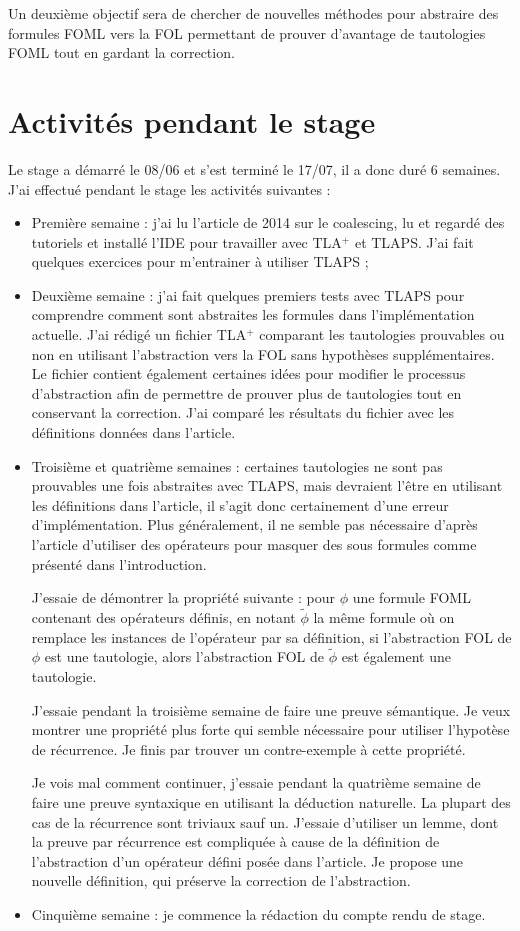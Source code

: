 \documentclass[12pt]{article}
\begin{document}
Un deuxième objectif sera de chercher de nouvelles méthodes pour abstraire des formules FOML vers la FOL permettant de prouver d'avantage de tautologies FOML tout en gardant la correction.

\section{Activités pendant le stage}

Le stage a démarré le 08/06 et s'est terminé le 17/\textcolor{myblue}{07}, il a donc duré 6 semaines.
J'ai effectué pendant le stage les activités suivantes :
\begin{itemize}
\item
  Première semaine :
  j'ai lu l'article de 2014 sur le coalescing, lu et regardé des tutoriels et installé l'IDE pour travailler avec TLA$^+$ et TLAPS. J'ai fait quelques exercices pour m'entrainer à utiliser TLAPS ;
\item
  Deuxième semaine :
  j'ai fait quelques premiers tests avec TLAPS pour comprendre comment sont abstraites les formules dans l'implémentation actuelle.
  J'ai rédigé un fichier TLA$^+$ comparant les tautologies prouvables ou non en utilisant l'abstraction vers la FOL sans hypothèses supplémentaires.
  Le fichier contient également certaines idées pour modifier le processus d'abstraction afin de permettre de prouver plus de tautologies tout en conservant la correction.
  J'ai comparé les résultats du fichier avec les définitions données dans l'article.
\item
  Troisième et quatrième semaines :
  certaines tautologies ne sont pas prouvables une fois abstraites avec TLAPS, mais devraient l'être en utilisant les définitions dans l'article, il s'agit donc certainement d'une erreur d'implémentation.
  Plus généralement, il ne semble pas nécessaire d'après l'article d'utiliser des opérateurs pour masquer des sous formules comme présenté dans l'introduction.
  
  J'essaie de démontrer la propriété suivante : pour $\phi$ une formule FOML contenant des opérateurs définis, en notant $\widetilde{\phi}$ la même formule où on remplace les instances de l'opérateur par sa définition, si l'abstraction FOL de $\phi$ est une tautologie, alors l'abstraction FOL de $\widetilde{\phi}$ est également une tautologie.

  J'essaie pendant la troisième semaine de faire une preuve sémantique.
  Je veux montrer une propriété plus forte qui semble nécessaire pour utiliser l'hypotèse de récurrence.
  Je finis par trouver un contre-exemple à cette propriété.

  Je vois mal comment continuer, j'essaie pendant la quatrième semaine de faire une preuve syntaxique en utilisant la déduction naturelle.
  La plupart des cas de la récurrence sont triviaux sauf un.
  J'essaie d'utiliser un lemme, dont la preuve par récurrence est compliquée à cause de la définition de l'abstraction d'un opérateur défini posée dans l'article.
  Je propose une nouvelle définition, qui préserve la correction de l'abstraction.
\item
  Cinquième semaine :
  je commence la rédaction du compte rendu de stage.
\end{itemize}
\end{document}
